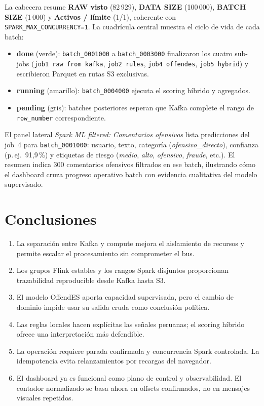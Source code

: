 \documentclass[11pt,a4paper,openany]{report}
\newcommand{\topic}[1]{\texttt{#1}}
\begin{document}
La cabecera resume \textbf{RAW visto} (82\,929), \textbf{DATA SIZE} (100\,000), \textbf{BATCH SIZE} (1\,000) y \textbf{Activos / límite} (1/1), coherente con \topic{SPARK\_MAX\_CONCURRENCY=1}. La cuadrícula central muestra el ciclo de vida de cada batch:
\begin{itemize}
  \item \textbf{done} (verde): \topic{batch\_0001000} a \topic{batch\_0003000} finalizaron los cuatro sub-jobs
  (\topic{job1 raw from kafka}, \topic{job2 rules}, \topic{job4 offendes}, \topic{job5 hybrid})
  y escribieron Parquet en rutas S3 exclusivas.
  \item \textbf{running} (amarillo): \topic{batch\_0004000} ejecuta el scoring híbrido y agregados.
  \item \textbf{pending} (gris): batches posteriores esperan que Kafka complete el rango de \topic{row\_number} correspondiente.
\end{itemize}

El panel lateral \emph{Spark ML filtered: Comentarios ofensivos} lista predicciones del job~4 para \topic{batch\_0001000}: usuario, texto, categoría (\emph{ofensivo\_directo}), confianza (p.\,ej.\ 91{,}9\,\%) y etiquetas de riesgo (\emph{medio}, \emph{alto}, \emph{ofensivo}, \emph{fraude}, etc.). El resumen indica 300 comentarios ofensivos filtrados en ese batch, ilustrando cómo el dashboard cruza progreso operativo batch con evidencia cualitativa del modelo supervisado.

\endgroup

\chapter{Conclusiones}

\begin{enumerate}
  \item La separación entre Kafka y compute mejora el aislamiento de recursos y permite escalar el procesamiento sin comprometer el bus.
  \item Los grupos Flink estables y los rangos Spark disjuntos proporcionan trazabilidad reproducible desde Kafka hasta S3.
  \item El modelo OffendES aporta capacidad supervisada, pero el cambio de dominio impide usar su salida cruda como conclusión política.
  \item Las reglas locales hacen explícitas las señales peruanas; el scoring híbrido ofrece una interpretación más defendible.
  \item La operación requiere parada confirmada y concurrencia Spark controlada. La idempotencia evita relanzamientos por recargas del navegador.
  \item El dashboard ya es funcional como plano de control y observabilidad. El contador normalizado se basa ahora en offsets confirmados, no en mensajes visuales repetidos.
\end{enumerate}
\end{document}
